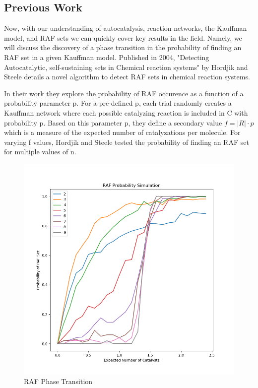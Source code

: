 \documentclass[11pt]{article}
\begin{document}
\subsection{Previous Work}

Now, with our understanding of autocatalysis, reaction networks, the Kauffman model, and RAF sets we can quickly cover key results in the field.
Namely, we will discuss the discovery of a phase transition in the probability of finding an RAF set in a given Kauffman model.
Published in 2004, "Detecting Autocatalytic, self-sustaining sets in Chemical reaction systems" by Hordjik and Steele details a novel algorithm to detect RAF sets in chemical reaction systems.

In their work they explore the probability of RAF occurence as a function of a probability parameter p. For a pre-defined p, each trial randomly creates a Kauffman network where each possible catalyzing reaction is included in C with probability p.
Based on this parameter p, they define a secondary value $f = |R| \cdot p$ which is a measure of the expected number of catalyzations per molecule.
For varying f values, Hordjik and Steele tested the probability of finding an RAF set for multiple values of n. 

\begin{figure}[H]
    \centering
    \includegraphics[width=12cm]{PhaseTransition.png}
    \caption{RAF Phase Transition}
\end{figure}
\end{document}
